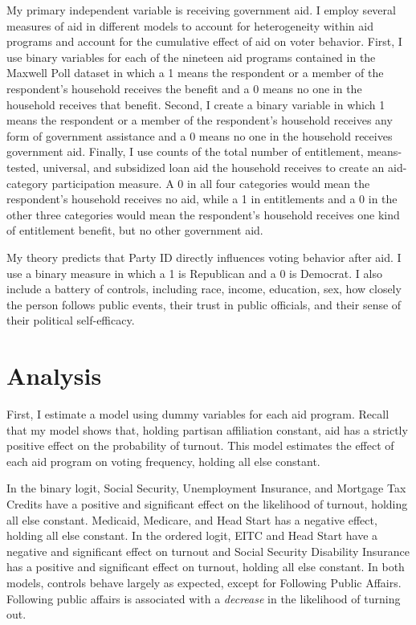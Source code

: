 \documentclass[12pt]{paper}
\begin{document}
My primary independent variable is receiving government aid. I employ several measures of aid in different models to account for heterogeneity within aid programs and account for the cumulative effect of aid on voter behavior. First, I use binary variables for each of the nineteen aid programs contained in the Maxwell Poll dataset in which a 1 means the respondent or a member of the respondent’s household receives the benefit and a 0 means no one in the household receives that benefit. Second, I create a binary variable in which 1 means the respondent or a member of the respondent’s household receives any form of government assistance and a 0 means no one in the household receives government aid. Finally, I use counts of the total number of entitlement, means-tested, universal, and subsidized loan aid the household receives to create an aid-category participation measure. A 0 in all four categories would mean the respondent’s household receives no aid, while a 1 in entitlements and a 0 in the other three categories would mean the respondent’s household receives one kind of entitlement benefit, but no other government aid.

My theory predicts that Party ID directly influences voting behavior after aid. I use a binary measure in which a 1 is Republican and a 0 is Democrat. I also include a battery of controls, including race, income, education, sex, how closely the person follows public events, their trust in public officials, and their sense of their political self-efficacy.

\section{Analysis}
First, I estimate a model using dummy variables for each aid program. Recall that my model shows that, holding partisan affiliation constant, aid has a strictly positive effect on the probability of turnout. This model estimates the effect of each aid program on voting frequency, holding all else constant.

In the binary logit, Social Security, Unemployment Insurance, and Mortgage Tax Credits have a positive and significant effect on the likelihood of turnout, holding all else constant. Medicaid, Medicare, and Head Start has a negative effect, holding all else constant. In the ordered logit, EITC and Head Start have a negative and significant effect on turnout and Social Security Disability Insurance has a positive and significant effect on turnout, holding all else constant. In both models, controls behave largely as expected, except for Following Public Affairs. Following public affairs is associated with a \textit{decrease} in the likelihood of turning out.
\end{document}
